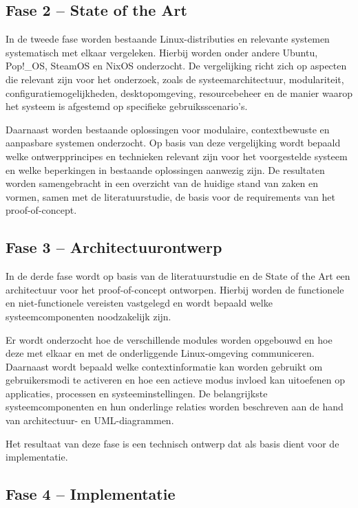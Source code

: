 \documentclass{hogent-article}
\begin{document}
\subsection{Fase 2 – State of the Art}
\label{ssec:fase2}

In de tweede fase worden bestaande Linux-distributies en relevante systemen systematisch met elkaar vergeleken. Hierbij worden onder andere Ubuntu, Pop!\_OS, SteamOS en NixOS onderzocht. De vergelijking richt zich op aspecten die relevant zijn voor het onderzoek, zoals de systeemarchitectuur, modulariteit, configuratiemogelijkheden, desktopomgeving, resourcebeheer en de manier waarop het systeem is afgestemd op specifieke gebruiksscenario's.

Daarnaast worden bestaande oplossingen voor modulaire, contextbewuste en aanpasbare systemen onderzocht. Op basis van deze vergelijking wordt bepaald welke ontwerpprincipes en technieken relevant zijn voor het voorgestelde systeem en welke beperkingen in bestaande oplossingen aanwezig zijn. De resultaten worden samengebracht in een overzicht van de huidige stand van zaken en vormen, samen met de literatuurstudie, de basis voor de requirements van het proof-of-concept.

\subsection{Fase 3 – Architectuurontwerp}
\label{ssec:fase3}

In de derde fase wordt op basis van de literatuurstudie en de State of the Art een architectuur voor het proof-of-concept ontworpen. Hierbij worden de functionele en niet-functionele vereisten vastgelegd en wordt bepaald welke systeemcomponenten noodzakelijk zijn.

Er wordt onderzocht hoe de verschillende modules worden opgebouwd en hoe deze met elkaar en met de onderliggende Linux-omgeving communiceren. Daarnaast wordt bepaald welke contextinformatie kan worden gebruikt om gebruikersmodi te activeren en hoe een actieve modus invloed kan uitoefenen op applicaties, processen en systeeminstellingen. De belangrijkste systeemcomponenten en hun onderlinge relaties worden beschreven aan de hand van architectuur- en UML-diagrammen.

Het resultaat van deze fase is een technisch ontwerp dat als basis dient voor de implementatie.

\subsection{Fase 4 – Implementatie}
\label{ssec:fase4}
\end{document}
